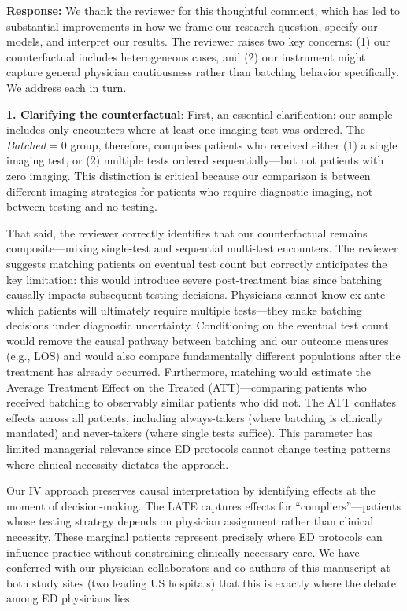 \documentclass[11pt]{article}
\newcommand{\1}{\hbox{\rm 1\kern-.35em 1}}
\begin{document}
\noindent\textbf{Response:} \color{blue}We thank the reviewer for this thoughtful comment, which has led to substantial improvements in how we frame our research question, specify our models, and interpret our results. The reviewer raises two key concerns: (1) our counterfactual includes heterogeneous cases, and (2) our instrument might capture general physician cautiousness rather than batching behavior specifically. We address each in turn.

\textbf{1. Clarifying the counterfactual}: First, an essential clarification: our sample includes only encounters where at least one imaging test was ordered. The $Batched=0$ group, therefore, comprises patients who received either (1) a single imaging test, or (2) multiple tests ordered sequentially—but not patients with zero imaging. This distinction is critical because our comparison is between different imaging strategies for patients who require diagnostic imaging, not between testing and no testing.

That said, the reviewer correctly identifies that our counterfactual remains composite---mixing single-test and sequential multi-test encounters. The reviewer suggests matching patients on eventual test count but correctly anticipates the key limitation: this would introduce severe post-treatment bias since batching causally impacts subsequent testing decisions. Physicians cannot know ex-ante which patients will ultimately require multiple tests---they make batching decisions under diagnostic uncertainty. Conditioning on the eventual test count would remove the causal pathway between batching and our outcome measures (e.g., LOS) and would also compare fundamentally different populations after the treatment has already occurred. Furthermore, matching would estimate the Average Treatment Effect on the Treated (ATT)---comparing patients who received batching to observably similar patients who did not. The ATT conflates effects across all patients, including always-takers (where batching is clinically mandated) and never-takers (where single tests suffice). This parameter has limited managerial relevance since ED protocols cannot change testing patterns where clinical necessity dictates the approach.

Our IV approach preserves causal interpretation by identifying effects at the moment of decision-making. The LATE captures effects for ``compliers''---patients whose testing strategy depends on physician assignment rather than clinical necessity. These marginal patients represent precisely where ED protocols can influence practice without constraining clinically necessary care. We have conferred with our physician collaborators and co-authors of this manuscript at both study sites (two leading US hospitals) that this is exactly where the debate among ED physicians lies.
\end{document}
